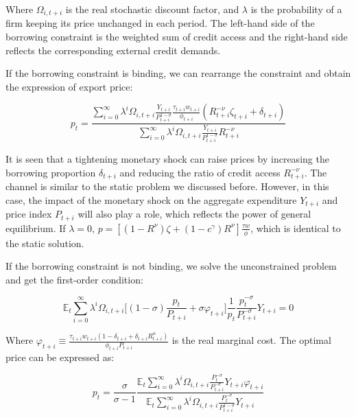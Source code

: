  Where $\Omega_{i,t+i}$ is the real stochastic discount factor, and $\lambda$ is the probability of a firm keeping its price unchanged in each period. The left-hand side of the borrowing constraint is the weighted sum of credit access and the right-hand side reflects the corresponding external credit demands.

If the borrowing constraint is binding, we can rearrange the constraint and obtain the expression of export price:

\begin{equation}
p_t=\frac{\sum_{i=0}^{\infty} \lambda^i \Omega_{i,t+i}\frac{Y_{t+i}}{P_{t+i}^{1-\sigma}}\frac{\tau_{t+i}w_{t+i}}{\phi_{t+i}}(R_{t+i}^{-\nu}\zeta_{t+i}+\delta_{t+i})}{\sum_{i=0}^{\infty} \lambda^i \Omega_{i,t+i}\frac{Y_{t+i}}{P_{t+i}^{1-\sigma}}R_{t+i}^{-\nu}}
\end{equation}

It is seen that a tightening monetary shock can raise prices by increasing the borrowing proportion $\delta_{t+i}$ and reducing the ratio of credit access $R_{t+i}^{-\nu}$. The channel is similar to the static problem we discussed before. However, in this case, the impact of the monetary shock on the aggregate expenditure $Y_{t+i}$ and price index $P_{t+i}$ will also play a role, which reflects the power of general equilibrium. If $\lambda=0$, $p=[(1-R^{\nu})\zeta+(1-c^\gamma)R^{\nu}] \frac{\tau w}{\phi}$, which is identical to the static solution.


If the borrowing constraint is not binding, we solve the unconstrained problem and get the first-order condition:


\begin{equation}
\mathbb{E}_t \sum_{i=0}^{\infty} \lambda^i \Omega_{i,t+i} \biggr[(1-\sigma)\frac{p_t}{P_{t+i}}+\sigma \varphi_{t+i}\biggr]\frac{1}{p_t}\frac{p_t^{-\sigma}}{P_{t+i}^{-\sigma}}Y_{t+i}=0
\end{equation}

Where $\varphi_{t+i}\equiv \frac{\tau_{t+i} w_{t+i}(1-\delta_{t+i}+\delta_{t+i} R_{t+i}^\alpha)}{\phi_{t+i}P_{t+i}}$ is the real marginal cost. The optimal price can be expressed as:

\begin{equation}
p_t=\frac{\sigma}{\sigma-1}\frac{\mathbb{E}_t \sum_{i=0}^{\infty} \lambda^i \Omega_{i,t+i}\frac{P_t^{-\sigma}}{P_{t+i}^{-\sigma}}Y_{t+i}\varphi_{t+i}}{\mathbb{E}_t \sum_{i=0}^{\infty} \lambda^i \Omega_{i,t+i}\frac{P_t^{-\sigma}}{P_{t+i}^{1-\sigma}}Y_{t+i}}
\end{equation}

